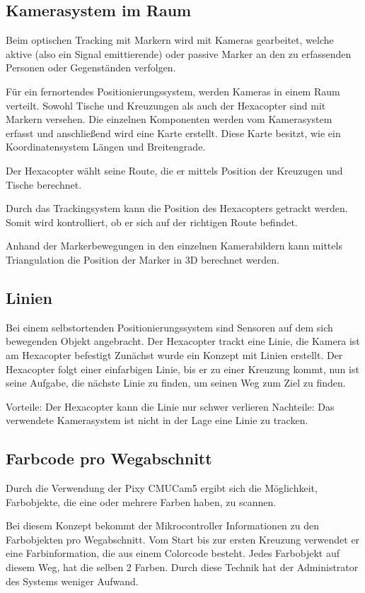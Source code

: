   \subsection*{Kamerasystem im Raum}

  Beim optischen Tracking mit Markern wird mit Kameras gearbeitet, welche aktive (also ein Signal emittierende) oder passive Marker an den zu erfassenden Personen oder Gegenständen verfolgen. 

  Für ein fernortendes Positionierungssystem, werden Kameras in einem Raum verteilt. 
  Sowohl Tische und Kreuzungen als auch der Hexacopter sind mit Markern versehen. Die einzelnen Komponenten werden vom Kamerasystem erfasst und anschließend wird eine Karte erstellt. Diese Karte besitzt, wie ein Koordinatensystem Längen und Breitengrade.

  Der Hexacopter wählt seine Route, die er mittels Position der Kreuzugen und Tische berechnet.

  Durch das Trackingsystem kann die Position des Hexacopters getrackt werden. Somit wird kontrolliert, ob er sich auf der richtigen Route befindet.

  Anhand der Markerbewegungen in den einzelnen Kamerabildern kann mittels Triangulation die Position der Marker in 3D berechnet werden.

  \subsection*{Linien}
  Bei einem selbstortenden Positionierungssystem sind Sensoren auf dem sich bewegenden Objekt angebracht.
  Der Hexacopter trackt eine Linie, die Kamera ist am Hexacopter befestigt
  Zunächst wurde ein Konzept mit Linien erstellt. Der Hexacopter folgt einer einfarbigen Linie, bis er zu einer Kreuzung kommt, nun ist seine Aufgabe, die nächste Linie zu finden, um seinen Weg zum Ziel zu finden.  

  Vorteile: Der Hexacopter kann die Linie nur schwer verlieren
  Nachteile: Das verwendete Kamerasystem ist nicht in der Lage eine Linie zu tracken.


  \subsection*{Farbcode pro Wegabschnitt}
  Durch die Verwendung der Pixy CMUCam5 ergibt sich die Möglichkeit, Farbobjekte, die eine oder mehrere Farben haben, zu scannen.

  Bei diesem Konzept bekommt der Mikrocontroller Informationen zu den Farbobjekten pro Wegabschnitt. Vom Start bis zur ersten Kreuzung verwendet er eine Farbinformation, die aus einem Colorcode besteht. Jedes Farbobjekt auf diesem Weg, hat die selben 2 Farben. Durch diese Technik hat der Administrator des Systems weniger Aufwand.

